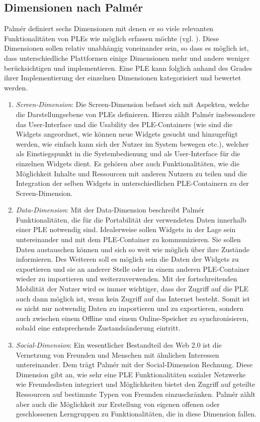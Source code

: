 \subsection{Dimensionen nach Palmér}\label{section:dimensions_palmer} 
Palmér definiert sechs Dimensionen mit denen er so viele relevanten Funktionalitäten von PLEs wie möglich erfassen möchte (vgl. \cite{Palmer2009}). Diese Dimensionen sollen relativ unabhängig voneinander sein, so dass es möglich ist, dass unterschiedliche Plattformen einige Dimensionen mehr und andere weniger berücksichtigen und implementieren. Eine PLE kann folglich anhand des Grades ihrer Implementierung der einzelnen Dimensionen kategorisiert und bewertet werden.
\begin{enumerate}
 \item \emph{Screen-Dimension}: Die Screen-Dimension befasst sich mit Aspekten, welche die Darstellungsebene von PLEs definieren. Hierzu zählt Palmér insbesondere das User-Interface und die Usability des PLE-Containers (wie sind die Widgets angeordnet, wie können neue Widgets gesucht und hinzugefügt werden, wie einfach kann sich der Nutzer im System bewegen etc.), welcher als Einstiegspunkt in die Systembedienung und als User-Interface für die einzelnen Widgets dient. Es gehören aber auch Funktionalitäten, wie die Möglichkeit Inhalte und Ressourcen mit anderen Nutzern zu teilen und die Integration der selben Widgets in unterschiedlichen PLE-Containern zu der Screen-Dimension.
 \item \emph{Data-Dimension}: Mit der Data-Dimension beschreibt Palmér Funktionalitäten, die für die Portabilität der verwendeten Daten innerhalb einer PLE notwendig sind. Idealerweise sollen Widgets in der Lage sein untereinander und mit dem PLE-Container zu kommunizieren. Sie sollen Daten austauschen können und sich so weit wie möglich über ihre Zustände informieren. Des Weiteren soll es möglich sein die Daten der Widgets zu exportieren und sie an anderer Stelle oder in einem anderen PLE-Container wieder zu importieren und weiterzuverwenden. Mit der fortschreitenden Mobilität der Nutzer wird es immer wichtiger, dass der Zugriff auf die PLE auch dann möglich ist, wenn kein Zugriff auf das Internet besteht. Somit ist es nicht nur notwendig Daten zu importieren und zu exportieren, sondern auch zwischen einem Offline und einem Online-Speicher zu synchronisieren, sobald eine entsprechende Zustandsänderung eintritt.
 \item \emph{Social-Dimension}: Ein wesentlicher Bestandteil des Web 2.0 ist die Vernetzung von Freunden und Menschen mit ähnlichen Interessen untereinander. Dem trägt Palmér mit der Social-Dimension Rechnung. Diese Dimension gibt an, wie sehr eine PLE Funktionalitäten sozialer Netzwerke wie Freundeslisten integriert und Möglichkeiten bietet den Zugriff auf geteilte Ressourcen auf bestimmte Typen von Freunden einzuschränken. Palmér zählt aber auch die Möglichkeit zur Erstellung von eigenen offenen oder geschlossenen Lerngruppen zu Funktionalitäten, die in diese Dimension fallen.

\end{enumerate}
